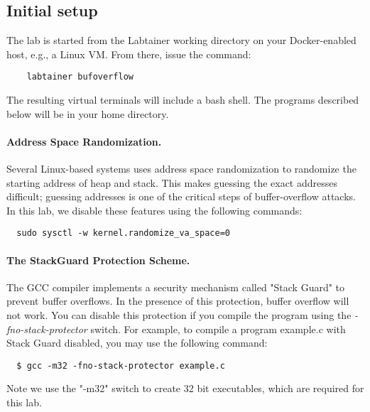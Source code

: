 \subsection{Initial setup}
The lab is started from the Labtainer working 
directory on your Docker-enabled host, e.g., a Linux VM.
From there, issue the command:
\begin{verbatim}
    labtainer bufoverflow
\end{verbatim}

The resulting virtual terminals will include a 
bash shell.  The programs
described below will be in your home directory.

\paragraph{Address Space Randomization.}
Several Linux-based systems uses address space
randomization to randomize the starting address of heap and
stack. This makes guessing the exact addresses difficult; guessing
addresses is one of the critical steps of buffer-overflow attacks.  In
this lab, we disable these features using the following commands:

\begin{verbatim}
  sudo sysctl -w kernel.randomize_va_space=0
\end{verbatim}


\paragraph{The StackGuard Protection Scheme.}
The GCC compiler implements a security mechanism called
"Stack Guard" to prevent buffer overflows. In the presence of this
protection, buffer overflow will not work. You can disable this
protection if you compile the program using the 
\emph{-fno-stack-protector} switch. For example, to compile a program
example.c with Stack Guard disabled, you may use the following command:
\begin{verbatim}
  $ gcc -m32 -fno-stack-protector example.c
\end{verbatim}
\noindent Note we use the "-m32" switch to create 32 bit executables, which
are required for this lab.

